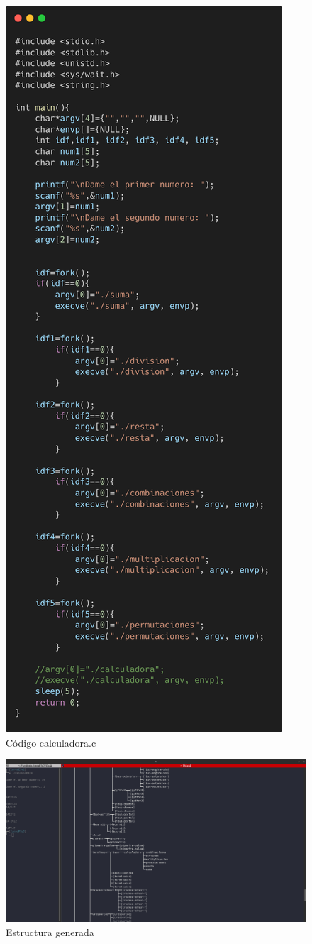 \documentclass[10pt]{article}
\begin{document}
	\begin{figure}[h!]
		\centering
		\includegraphics[width=0.5\linewidth]{calculadora2.png}
		\caption{Código calculadora.c}
		\label{fig:calculadora2}
	\end{figure}
	\begin{figure}[h!]
		\centering
		\includegraphics[width=\linewidth]{pruebaE2}
		\caption{Estructura generada}
		\label{fig:pruebae2}
	\end{figure}
	


	
	
\end{document}
